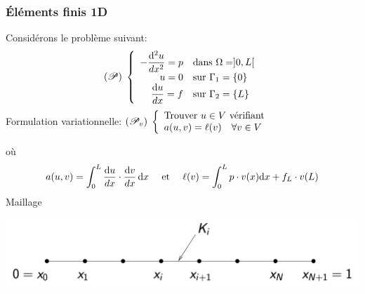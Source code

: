 \documentclass{beamer}
\def \de {{\rm d}}
\begin{document}
\begin{frame}
\frametitle{Éléments finis 1D}
Considérons le problème suivant:
\[
({\cal P})\;\left\{
\begin{array}{rl}
-\displaystyle \frac{\de^2 u}{dx^2}=p&\mbox{dans } \Omega=]0,L[\\
u=0& \mbox{sur } \Gamma_1=\{0\} \\
\displaystyle \frac{\de u}{dx}=f & \mbox{sur } \Gamma_2=\{L\} 
\end{array}
\right.
\]
Formulation variationnelle: $
({\cal P}_v)\;\left\{
\begin{array}{l}
\mbox{Trouver } u\in V \mbox{ vérifiant}\\
a(u,v)=\ell(v)\quad \forall v\in V
\end{array}
\right.
$

où \[ a(u,v)=\displaystyle \int_0^L\frac{\de u}{dx}\cdot \frac{\de v}{dx}\,\de x\quad \mbox{ et }\quad \ell(v)=\displaystyle \int_0^L p\cdot v(x)\de x +f_L \cdot v(L)\]
Maillage
\begin{center}
\includegraphics[scale=0.2]{mailleD1.png} 
\end{center}
\end{frame}
\end{document}
